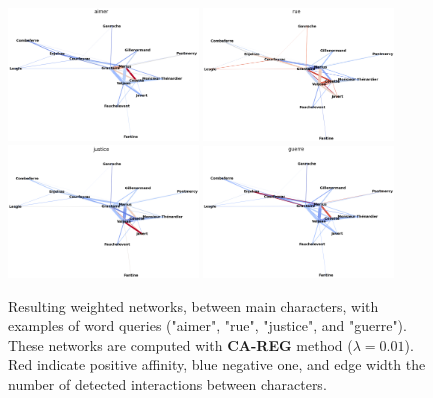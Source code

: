 \documentclass[
twocolumn,
]{ceurart}
\begin{document}
\begin{figure}[!bh]
	\centering
	\includegraphics[width=0.45\textwidth]{fig/aimer.png} \includegraphics[width=0.45\textwidth]{fig/rue.png}
	\includegraphics[width=0.45\textwidth]{fig/justice.png}
	\includegraphics[width=0.45\textwidth]{fig/guerre.png}
	\label{networks}
	\caption{Resulting weighted networks, between main characters, with examples of word queries ("aimer", "rue", "justice", and "guerre"). These networks are computed with \textbf{CA-REG} method ($\lambda = 0.01$). Red indicate positive affinity, blue negative one, and edge width the number of detected interactions between characters.}
\end{figure}

\end{document}
